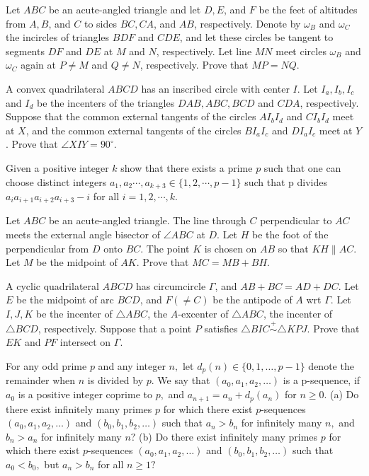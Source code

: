 \documentclass[11pt]{scrartcl}
\begin{document}
\begin{problem}[57940096937913]
Let $ABC$ be an acute-angled triangle and let $D, E$, and $F$ be the feet of altitudes from $A, B$, and $C$ to sides $BC, CA$, and $AB$, respectively. Denote by $\omega_B$ and $\omega_C$ the incircles of triangles $BDF$ and $CDE$, and let these circles be tangent to segments $DF$ and $DE$ at $M$ and $N$, respectively. Let line $MN$ meet circles $\omega_B$ and $\omega_C$ again at $P \ne M$ and $Q \ne N$, respectively. Prove that $MP = NQ$.
\end{problem}
\begin{problem}[4451072691230235426]
A convex quadrilateral $ABCD$ has an inscribed circle with center $I$. Let $I_a, I_b, I_c$ and $I_d$ be the incenters of the triangles $DAB, ABC, BCD$ and $CDA$, respectively. Suppose that the common external tangents of the circles $AI_bI_d$ and $CI_bI_d$ meet at $X$, and the common external tangents of the circles $BI_aI_c$ and $DI_aI_c$ meet at $Y$. Prove that $\angle{XIY}=90^{\circ}$.
\end{problem}
\begin{problem}[961350373727093]
Given a positive integer $k$ show that there exists a prime $p$ such that one can choose distinct integers $a_1,a_2\cdots, a_{k+3} \in \{1, 2, \cdots ,p-1\}$ such that p divides $a_ia_{i+1}a_{i+2}a_{i+3}-i$ for all $i= 1, 2, \cdots, k$.
\end{problem}
\begin{problem}[5441518070935718077]
	Let $ABC$ be an acute-angled triangle. The line through $C$ perpendicular to $AC$ meets the external angle bisector of $\angle ABC$ at $D$. Let $H$ be the foot of the perpendicular from $D$ onto $BC$. The point $K$ is chosen on $AB$ so that $KH \parallel AC$. Let $M$ be the midpoint of $AK$. Prove that $MC = MB + BH$.
\end{problem}
\begin{problem}[571352513856417722]
	A cyclic quadrilateral $ABCD$ has circumcircle $\Gamma$, and $AB+BC=AD+DC$. Let $E$ be the midpoint of arc $BCD$, and $F (\neq C)$ be the antipode of $A$ wrt $\Gamma$. Let $I,J,K$ be the incenter of $\triangle ABC$, the $A$-excenter of $\triangle ABC$, the incenter of $\triangle BCD$, respectively.
Suppose that a point $P$ satisfies $\triangle BIC \stackrel{+}{\sim} \triangle KPJ$. Prove that $EK$ and $PF$ intersect on $\Gamma.$
\end{problem}
\begin{problem}[522990139281725]
	For any odd prime $p$ and any integer $n,$ let $d_p (n) \in \{ 0,1, \dots, p-1 \}$ denote the remainder when $n$ is divided by $p.$ We say that $(a_0, a_1, a_2, \dots)$ is a p-sequence, if $a_0$ is a positive integer coprime to $p,$ and $a_{n+1} =a_n + d_p (a_n)$ for $n \geqslant 0.$
(a) Do there exist infinitely many primes $p$ for which there exist $p$-sequences $(a_0, a_1, a_2, \dots)$ and $(b_0, b_1, b_2, \dots)$ such that $a_n >b_n$ for infinitely many $n,$ and $b_n > a_n$ for infinitely many $n?$
(b) Do there exist infinitely many primes $p$ for which there exist $p$-sequences $(a_0, a_1, a_2, \dots)$ and $(b_0, b_1, b_2, \dots)$ such that $a_0 <b_0,$ but $a_n >b_n$ for all $n \geqslant 1?$
\end{problem}
\end{document}
